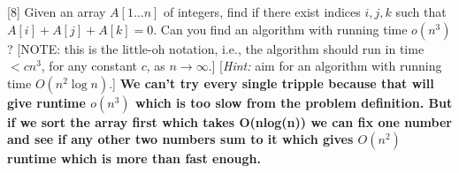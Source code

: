 \documentclass[addpoints]{exam}
\begin{document}
\begin{questions}


[8]
Given an array $A[1 \dots n]$ of integers, find if there exist indices $i, j, k$ such that $A[i]+A[j]+A[k] = 0$.  Can you find an algorithm with running time $o(n^3)$? [NOTE: this is the little-oh notation, i.e., the algorithm should run in time $< cn^3$, for any constant $c$, as $n \rightarrow \infty$.] [{\em Hint:} aim for an algorithm with running time $O(n^2 \log n)$.]
\textbf{We can't try every single tripple because that will give runtime $o(n^3)$ which is too slow from the problem definition. But if we sort the array first which takes O(nlog(n)) we can fix one number and see if any other two numbers sum to it which gives $O(n^2)$ runtime which is more than fast enough.}

\end{questions}
\end{document}
